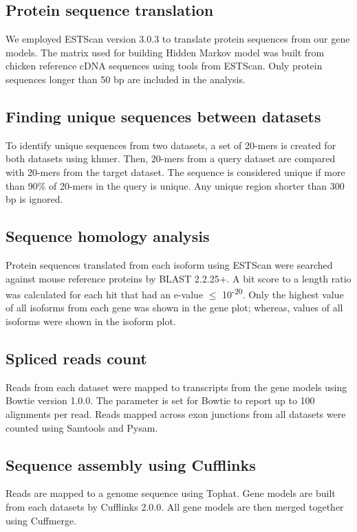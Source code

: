 \documentclass[10pt]{article}
\begin{document}
\subsection*{Protein sequence translation}

We employed ESTScan version 3.0.3 to translate protein sequences from our gene
models.  The matrix used for building Hidden Markov model was built from chicken
reference cDNA sequences using tools from ESTScan. Only protein sequences longer
than 50 bp are included in the analysis.

\subsection*{Finding unique sequences between datasets}

To identify unique sequences from two datasets, a set of 20-mers is created for
both datasets using khmer\cite{khmer}.  Then, 20-mers from a query dataset are
compared with 20-mers from the target dataset.  The sequence is considered
unique if more than 90\% of 20-mers in the query is unique.  Any unique region
shorter than 300 bp is ignored.

\subsection*{Sequence homology analysis}

Protein sequences translated from each isoform using ESTScan were searched
against mouse reference proteins by BLAST 2.2.25+\cite{Tatusova:1999tz}.  A bit
score to a length ratio was calculated for each hit that had an e-value $\le$
10\textsuperscript{-20}.  Only the highest value of all isoforms from each gene
was shown in the gene plot; whereas, values of all isoforms were shown in the
isoform plot.

\subsection*{Spliced reads count}

Reads from each dataset were mapped to transcripts from the gene models using
Bowtie version 1.0.0. The parameter is set for Bowtie to report up to 100
alignments per read.  Reads mapped across exon junctions from all datasets were
counted using Samtools\cite{Li:2009vz} and Pysam\cite{pysam}.

\subsection*{Sequence assembly using Cufflinks}
Reads are mapped to a genome sequence using Tophat.  Gene models are built from
each datasets by Cufflinks 2.0.0\cite{Trapnell:2010kd}.  All gene models are
then merged together using Cuffmerge.
\end{document}
